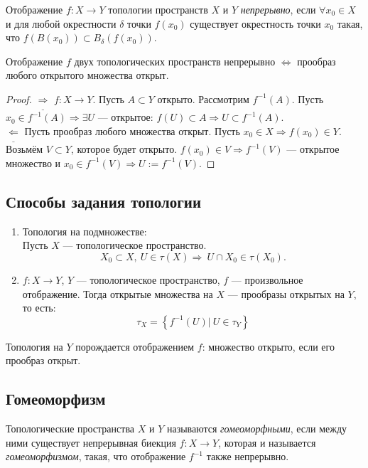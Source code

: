 \begin{definition}
    Отображение $f: X \to Y$ топологии пространств $X$ и $Y$ \textit{непрерывно}, если $\forall x_0 \in X$ и для любой окрестности $\delta$ точки $f(x_0)$ существует окрестность точки $x_0$ такая, что $f(B(x_0)) \subset B_{\delta} (f(x_0))$.
\end{definition}

\begin{statement}
    Отображение $f$ двух топологических пространств непрерывно $\Leftrightarrow$ прообраз любого открытого множества открыт.
\end{statement}
\begin{proof}
    $\underline{\Longrightarrow}$ $f: X \to Y$. Пусть $A \subset Y$ открыто. Рассмотрим $f^{-1}(A)$. Пусть $x_0 \in f^{-1}(A) \Rightarrow \exists U$ — открытое: $f(U) \subset A \Rightarrow U \subset f^{-1}(A)$. \\
    $\underline{\Longleftarrow}$ Пусть прообраз любого множества открыт. Пусть $x_0 \in X \Rightarrow f(x_0) \in Y$. Возьмём $V \subset Y$, которое будет открыто. $f(x_0) \in V \Rightarrow f^{-1}(V)$ — открытое множество и $x_0 \in f^{-1}(V) \Rightarrow U := f^{-1}(V)$.
\end{proof}

\subsection{Способы задания топологии}
\begin{enumerate}
    \item Топология на подмножестве: \\
    Пусть $X$ — топологическое пространство. $$X_0 \subset X, \ U \in \tau(X) \Rightarrow \ U \cap X_0 \in \tau(X_0).$$
    \item $f: X \to Y$, $Y$ — топологическое пространство, $f$ — произвольное отображение. Тогда открытые множества на $X$ — прообразы открытых на $Y$, то есть:
    \[\tau_X = \left\{f^{-1}(U) | \ U \in \tau_Y\right\}\]
\end{enumerate}

\begin{remark}
    Топология на $Y$ порождается отображением $f$: множество открыто, если его прообраз открыт.
\end{remark}

\subsection{Гомеоморфизм}
\begin{definition}
    Топологические пространства $X$ и $Y$ называются \textit{гомеоморфными}, если между ними существует непрерывная биекция $f: X \to Y$, которая и называется \textit{гомеоморфизмом}, такая, что отображение $f^{-1}$ также непрерывно.
\end{definition}

